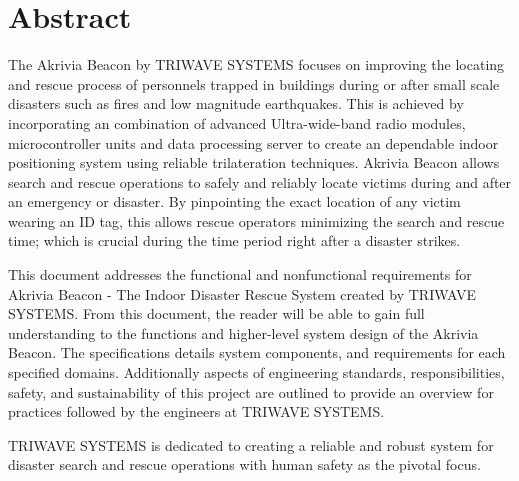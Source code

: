 %


\section*{Abstract}	

\bigskip
The Akrivia Beacon by TRIWAVE SYSTEMS focuses on improving the locating and rescue process of personnels trapped in buildings during or after small scale disasters such as fires and low magnitude earthquakes. This is achieved by incorporating an combination of advanced Ultra-wide-band radio modules, microcontroller units and data processing server to create an dependable indoor positioning system using reliable trilateration techniques. Akrivia Beacon allows search and rescue operations to safely and reliably locate victims during and after an emergency or disaster. By pinpointing the exact location of any victim wearing an ID tag, this allows rescue operators minimizing the search and rescue time; which is crucial during the time period right after a disaster strikes.

\bigskip
This document addresses the functional and nonfunctional requirements for Akrivia Beacon - The Indoor Disaster Rescue System created by TRIWAVE SYSTEMS. From this document, the reader will be able to gain full understanding to the functions and higher-level system design of the Akrivia Beacon. The specifications details system components, and requirements for each specified domains. Additionally aspects of engineering standards, responsibilities, safety, and sustainability of this project are outlined to provide an overview for practices followed by the engineers at TRIWAVE SYSTEMS.

\bigskip
TRIWAVE SYSTEMS is dedicated to creating a reliable and robust system for disaster search and rescue operations with human safety as the pivotal focus.   

%